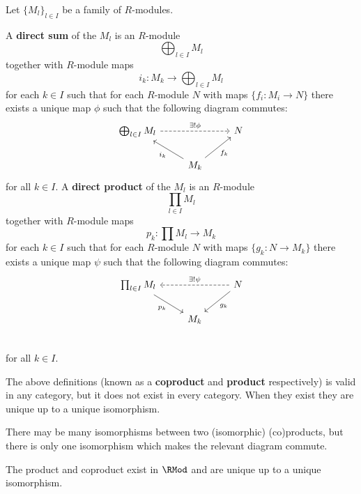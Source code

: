 \begin{defn}[1.7]\label{def:prod}
	Let $\{M_l\}_{l \in I}$ be a family of $R$-modules.
	\begin{enum}
		\io A \textbf{direct sum} of the $M_l$ is an $R$-module
		\[\bigoplus_{l \in I} M_l\]
		together with $R$-module maps
		\[i_k: M_k \to \bigoplus_{l \in I} M_l\]
		for each $k \in I$ such that for each $R$-module $N$ with maps $\{f_i: M_i \to N\}$ there exists a unique map $\phi$ such that the following diagram commutes:
		\[
			\begin{tikzcd}
				\bigoplus_{l \in I} M_l \ar[rr, dashed, "\exists ! \phi"] & & N \\
				& M_k \ar[ul, "i_k"] \ar[ur, swap, "f_k"]
			\end{tikzcd}
		\]
		for all $k \in I$.
		\io A \textbf{direct product} of the $M_l$ is an $R$-module
		\[\prod_{l \in I} M_l\]
		together with $R$-module maps
		\[p_k: \prod M_l \to M_k\]
		for each $k \in I$ such that for each $R$-module $N$ with maps $\{g_k: N \to M_k\}$ there exists a unique map $\psi$ such that the following diagram commutes:
		\[
		\begin{tikzcd}
		\prod_{l \in I} M_l \ar[dr, swap, "p_k"] & & N \ar[ll, dashed, swap, "\exists ! \psi"] \ar[dl, "g_k"] \\
		& M_k & \\
		\end{tikzcd}
		\]
		for all $k \in I$.
	\end{enum}
\end{defn}

\begin{rmk}
	The above definitions (known as a \textbf{coproduct} and \textbf{product} respectively) is valid in any category, but it does not exist in every category.
	When they exist they are unique up to a unique isomorphism.
\end{rmk}

\begin{rmk}
	There may be many isomorphisms between two (isomorphic) (co)products, but there is only one isomorphism which makes the relevant diagram commute.
\end{rmk}

\begin{prop}
	The product and coproduct exist in $\RMod$ and are unique up to a unique isomorphism.
\end{prop}

